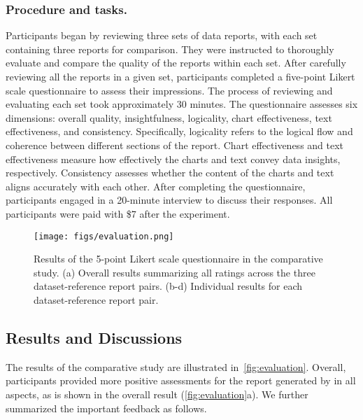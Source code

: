 \subsubsection{Procedure and tasks. }
Participants began by reviewing three sets of data reports, with each set containing three reports for comparison. They were instructed to thoroughly evaluate and compare the quality of the reports within each set. After carefully reviewing all the reports in a given set, participants completed a five-point Likert scale questionnaire to assess their impressions. The process of reviewing and evaluating each set took approximately 30 minutes.
The questionnaire assesses six dimensions: overall quality, insightfulness, logicality, chart effectiveness, text effectiveness, and consistency.
Specifically, logicality refers to the logical flow and coherence between different sections of the report.
Chart effectiveness and text effectiveness measure how effectively the charts and text convey data insights, respectively.
Consistency assesses whether the content of the charts and text aligns accurately with each other.
After completing the questionnaire, participants engaged in a 20-minute interview to discuss their responses.
All participants were paid with \$7 after the experiment. 


\begin{figure*}[!htb] 
  \centering 
  \texttt{[image: figs/evaluation.png]}
  \caption{Results of the 5-point Likert scale questionnaire in the comparative study. (a) Overall results summarizing all ratings across the three dataset-reference report pairs. (b-d) Individual results for each dataset-reference report pair.
  }
  \label{fig:evaluation} 
\end{figure*}

\subsection{Results and Discussions}

The results of the comparative study are illustrated in~\autoref{fig:evaluation}. 
Overall, participants provided more positive assessments for the report generated by \system{} in all aspects, as is shown in the overall result (\autoref{fig:evaluation}a). 
We further summarized the important feedback as follows. 

